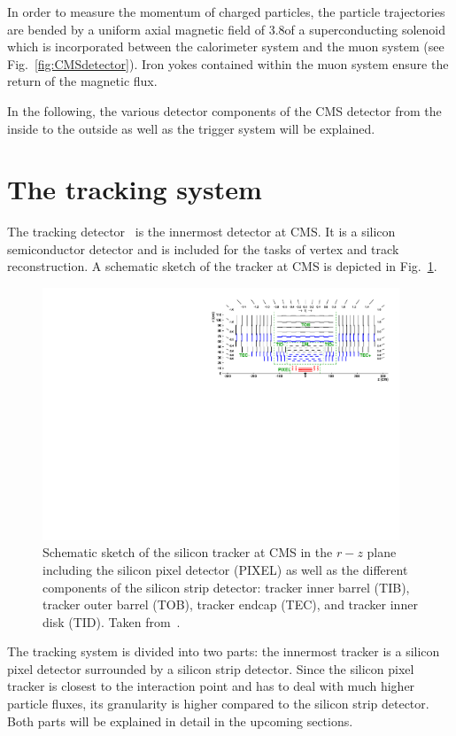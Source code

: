 In order to measure the momentum of charged particles, the particle trajectories are bended by a uniform axial magnetic field of 3.8\tesla of a superconducting solenoid which is incorporated between the calorimeter system and the muon system (see Fig.~\ref{fig:CMSdetector}).
Iron yokes contained within the muon system ensure the return of the magnetic flux. 

In the following, the various detector components of the CMS detector from the inside to the outside as well as the trigger system will be explained.
\FloatBarrier
\section{The tracking system}
\label{sec:TrackingSystem}
The tracking detector~\cite{bib:CMS:TDR_2006,bib:CMS:Tracker_1997,bib:CMS:Tracker_2000} is the innermost detector at CMS. 
It is a silicon semiconductor detector and is included for the tasks of vertex and track reconstruction.
A schematic sketch of the tracker at CMS is depicted in Fig.~\ref{fig:Tracker}.
\begin{figure}[!b]
  \centering
      \includegraphics[width=0.95\textwidth]{figures/experiment/CMS/TrackerLayoutNew.pdf}
  \caption{Schematic sketch of the silicon tracker at CMS in the $r - z$ plane including the silicon pixel detector (PIXEL) as well as the different components of the silicon strip detector: tracker inner barrel (TIB), tracker outer barrel (TOB), tracker endcap (TEC), and tracker inner disk (TID). Taken from~\cite{bib:CMS:tracking_8TeV}.
           }  
  \label{fig:Tracker}
\end{figure}
The tracking system is divided into two parts: the innermost tracker is a silicon pixel detector surrounded by a silicon strip detector.
Since the silicon pixel tracker is closest to the interaction point and has to deal with much higher particle fluxes, its granularity is higher compared to the silicon strip detector.
Both parts will be explained in detail in the upcoming sections.


